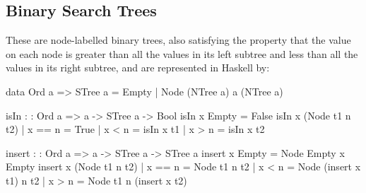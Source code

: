 \documentclass[10pt]{article}
\begin{document}
\subsection{Binary Search Trees}
These are node-labelled binary trees, also satisfying the property that the value on each node is greater than all the values in its left subtree and less than all the values in its right subtree, and are represented in Haskell by:
\begin{code}
data Ord a => STree a = Empty | Node (NTree a) a (NTree a)

isIn : : Ord a => a -> STree a -> Bool
isIn x Empty = False
isIn x (Node t1 n t2)
  | x == n = True
  | x < n = isIn x t1
  | x > n = isIn x t2

insert : : Ord a => a -> STree a -> STree a
insert x Empty = Node Empty x Empty
insert x (Node t1 n t2)
  | x == n = Node t1 n t2
  | x < n  = Node (insert x t1) n t2
  | x > n  = Node t1 n (insert x t2)
\end{code}
\end{document}

